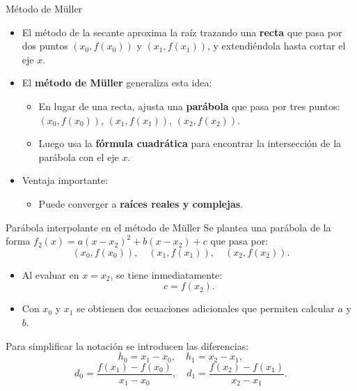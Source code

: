 \documentclass[../../main.tex]{subfiles}
\begin{document}
\begin{frame}{Método de Müller}
  \begin{itemize}
    \item El método de la secante aproxima la raíz trazando una \textbf{recta}
    que pasa por dos puntos \((x_0, f(x_0))\) y \((x_1, f(x_1))\), y extendiéndola
    hasta cortar el eje \(x\).
    \item El \textbf{método de Müller} generaliza esta idea:
    \begin{itemize}
      \item En lugar de una recta, ajusta una \textbf{parábola} que pasa por
            tres puntos: \((x_0, f(x_0))\), \((x_1, f(x_1))\), \((x_2, f(x_2))\).
      \item Luego usa la \textbf{fórmula cuadrática} para encontrar la intersección
            de la parábola con el eje \(x\).
    \end{itemize}
    \item Ventaja importante:
    \begin{itemize}
      \item Puede converger a \textbf{raíces reales y complejas}.
    \end{itemize}
  \end{itemize}
\end{frame}

\begin{frame}{Parábola interpolante en el método de Müller}
  Se plantea una parábola de la forma  \(
    f_2(x) = a(x - x_2)^2 + b(x - x_2) + c
  \)
  que pasa por:
  \[
    (x_0, f(x_0)), \quad (x_1, f(x_1)), \quad (x_2, f(x_2)).
  \]

  \begin{itemize}
    \item Al evaluar en \(x = x_2\), se tiene inmediatamente:
      \[
        c = f(x_2).
      \]
    \item Con \(x_0\) y \(x_1\) se obtienen dos ecuaciones adicionales que
          permiten calcular \(a\) y \(b\).
  \end{itemize}

  Para simplificar la notación se introducen las diferencias:
  \[
    h_0 = x_1 - x_0, \quad h_1 = x_2 - x_1,
  \]
  \[
    d_0 = \frac{f(x_1) - f(x_0)}{x_1 - x_0}, \quad
    d_1 = \frac{f(x_2) - f(x_1)}{x_2 - x_1}.
  \]
\end{frame}
\end{document}
